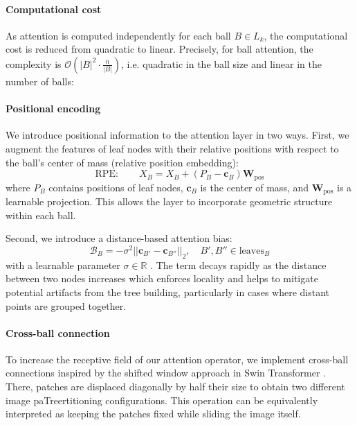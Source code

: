\paragraph{Computational cost}
As attention is computed independently for each ball $B \in L_k$, the computational cost is reduced from quadratic to linear. Precisely, for ball attention, the complexity is $\mathcal{O}(|B|^2 \cdot \frac{n}{|B|})$, i.e. quadratic in the ball size and linear in the number of balls:


\paragraph{Positional encoding}
We introduce positional information to the attention layer in two ways. First, we augment the features of leaf nodes with their relative positions with respect to the ball's center of mass (relative position embedding):
\begin{equation}
\label{eq:rpe}
    \text{RPE}: \qquad X_B = X_B + (P_B - \mathbf{c}_B) \mathbf{W}_{\mathrm{pos}}
\end{equation}
where $P_B$ contains positions of leaf nodes, $\mathbf{c}_B$ is the center of mass, and $\mathbf{W}_{\mathrm{pos}}$ is a learnable projection. This allows the layer to incorporate geometric structure within each ball. 

Second, we introduce a distance-based attention bias:
\begin{equation}
\label{eq:bias}
    \mathcal{B}_{B} = - \sigma^2 ||\mathbf{c}_{B'} - \mathbf{c}_{B''}||_2, \quad B', B'' \in \mathrm{leaves}_B
\end{equation}
with a learnable parameter $\sigma \in \mathbb{R}$ \cite{Wessels2024GroundingCR}. The term decays rapidly as the distance between two nodes increases which enforces locality and helps to mitigate potential artifacts from the tree building, particularly in cases where distant points are grouped together.

\paragraph{Cross-ball connection}
To increase the receptive field of our attention operator, we implement cross-ball connections inspired by the shifted window approach in Swin Transformer \cite{Liu2021SwinTH}. There, patches are displaced diagonally by half their size to obtain two different image paTreertitioning configurations. This operation can be equivalently interpreted as keeping the patches fixed while sliding the image itself. 

